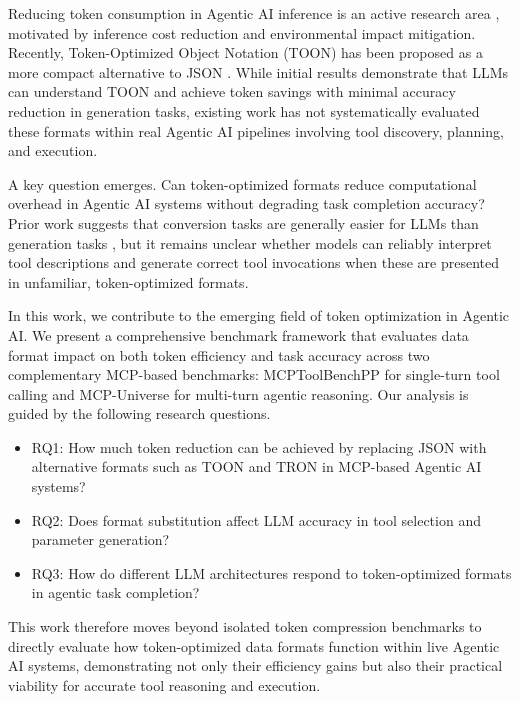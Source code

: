\documentclass[10pt,twocolumn,letterpaper]{article}
\begin{document}
Reducing token consumption in Agentic AI inference is an active research area \citep{Yang_He_Gao_Cao_Li_Hsu_2025, Zhang_Wang_Xu_Zhang_Lyu_Chen_Liu_Xu_Zhao_Gao_et_al._2025, Han_Wang_Fang_Zhao_Ma_Chen_2025, Ro_Qiu_Goiri_Fonseca_Bianchini_Akella_Wang_Erez_Choukse_2025}, motivated by inference cost reduction and environmental impact mitigation. Recently, Token-Optimized Object Notation (TOON) has been proposed as a more compact alternative to JSON \citep{Masciari_Moscato_Napolitano_Orlando_Perillo_Russo_2026, Lafalce_2025}. While initial results demonstrate that LLMs can understand TOON and achieve token savings with minimal accuracy reduction in generation tasks, existing work has not systematically evaluated these formats within real Agentic AI pipelines involving tool discovery, planning, and execution.

A key question emerges. Can token-optimized formats reduce computational overhead in Agentic AI systems without degrading task completion accuracy? Prior work suggests that conversion tasks are generally easier for LLMs than generation tasks \citep{Masciari_Moscato_Napolitano_Orlando_Perillo_Russo_2026}, but it remains unclear whether models can reliably interpret tool descriptions and generate correct tool invocations when these are presented in unfamiliar, token-optimized formats.

In this work, we contribute to the emerging field of token optimization in Agentic AI. We present a comprehensive benchmark framework that evaluates data format impact on both token efficiency and task accuracy across two complementary MCP-based benchmarks: MCPToolBenchPP for single-turn tool calling and MCP-Universe for multi-turn agentic reasoning. Our analysis is guided by the following research questions.
\begin{itemize}
    \item RQ1: How much token reduction can be achieved by replacing JSON with alternative formats such as TOON and TRON in MCP-based Agentic AI systems?
    
    \item RQ2: Does format substitution affect LLM accuracy in tool selection and parameter generation?
    
    \item RQ3: How do different LLM architectures respond to token-optimized formats in agentic task completion?
\end{itemize}


This work therefore moves beyond isolated token compression benchmarks to directly evaluate how token-optimized data formats function within live Agentic AI systems, demonstrating not only their efficiency gains but also their practical viability for accurate tool reasoning and execution.
\end{document}
